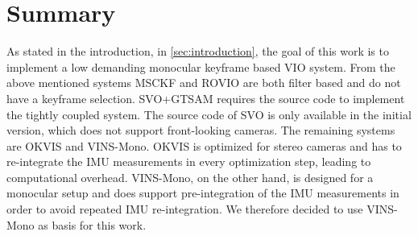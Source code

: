 \section{Summary}
As stated in the introduction, in \autoref{sec:introduction}, the goal of this 
work is to implement a low demanding monocular keyframe based \ac{VIO} system. 
From the above mentioned systems MSCKF and ROVIO are both filter based and do 
not have a keyframe selection. SVO+GTSAM requires the source code to implement 
the tightly coupled system. The source code of SVO is only available in the 
initial version, which does not support front-looking cameras. The remaining 
systems are OKVIS and VINS-Mono. OKVIS is optimized for stereo cameras and has 
to re-integrate the \ac{IMU} measurements in every optimization step, leading 
to computational overhead. VINS-Mono, on the other hand, is designed for a 
monocular setup and does support pre-integration of the \ac{IMU} measurements in 
order to avoid repeated \ac{IMU} re-integration. We therefore decided to use 
VINS-Mono as basis for this work. 
